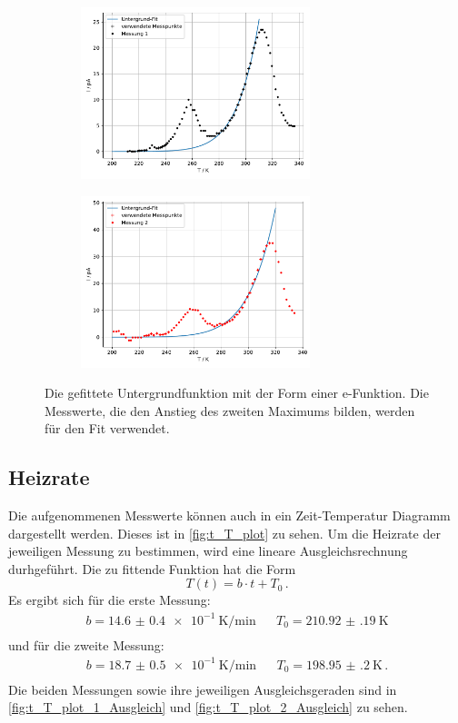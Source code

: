   \begin{figure}[H]
    \begin{subfigure}[b]{.5\linewidth}
      \centering
      \includegraphics[height=5cm, keepaspectratio]{build/untergrund_1.pdf}
    \end{subfigure}
    \begin{subfigure}[b]{.5\linewidth}
      \centering
      \includegraphics[height=5cm, keepaspectratio]{build/untergrund_2.pdf}
    \end{subfigure}
    
    \caption{Die gefittete Untergrundfunktion mit der Form einer e-Funktion.
      Die Messwerte, die den Anstieg des zweiten Maximums bilden, werden für den Fit verwendet.}
    \label{fig:T_I_plot_Untergrund}
  \end{figure} %

\subsection{Heizrate}
  Die aufgenommenen Messwerte können auch in ein Zeit-Temperatur Diagramm dargestellt werden.
  Dieses ist in \autoref{fig:t_T_plot} zu sehen.
  Um die Heizrate der jeweiligen Messung zu bestimmen, wird eine lineare Ausgleichsrechnung durhgeführt.
  Die zu fittende Funktion hat die Form
  \begin{equation*}
    T(t) = b \cdot t + T_0 \, .
  \end{equation*}
  Es ergibt sich für die erste Messung:
  \begin{align*}
    b = \SI{14.6(04)e-1}{\kelvin\per\minute} &&  T_0 = \SI{210.92(19)}{\kelvin}\\
  \end{align*}
  und für die zweite Messung:
  \begin{align*}
    b =  \SI{18.7(05)e-1}{\kelvin\per\minute}  &&  T_0 = \SI{198.95(20)}{\kelvin} \, . \\
  \end{align*}
  Die beiden Messungen sowie ihre jeweiligen Ausgleichsgeraden sind in \autoref{fig:t_T_plot_1_Ausgleich} und \autoref{fig:t_T_plot_2_Ausgleich} zu sehen.

